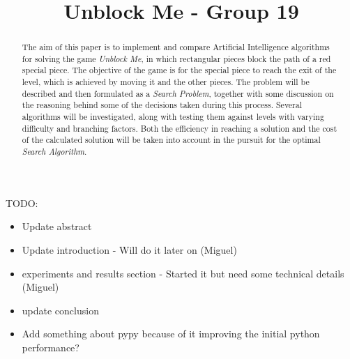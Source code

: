 \documentclass[conference]{IEEEtran}
\begin{document}
\title{Unblock Me - Group 19}

\author{
\and
{}
\and
{}
}

\maketitle

TODO:
\begin{itemize}
    \item Update abstract
    \item Update introduction - Will do it later on (Miguel)
    \item experiments and results section - Started it but need some technical details (Miguel)
    \item update conclusion
    \item Add something about pypy because of it improving the initial python performance?
\end{itemize}


\begin{abstract}
The aim of this paper is to implement and compare Artificial Intelligence algorithms for solving the game \textit{Unblock Me}, in which rectangular pieces block the path of a red special piece. The objective of the game is for the special piece to reach the exit of the level, which is achieved by moving it and the other pieces.
The problem will be described and then formulated as a \textit{Search Problem}, together with some discussion on the reasoning behind some of the decisions taken during this process.
Several algorithms will be investigated, along with testing them against levels with varying difficulty and branching factors. Both the efficiency in reaching a solution and the cost of the calculated solution will be taken into account in the pursuit for the optimal \textit{Search Algorithm}.
\end{abstract}
\end{document}
